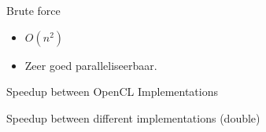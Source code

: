 \documentclass{beamer}
\begin{document}
	\begin{frame}{Brute force}
		\begin{itemize}
			\item $O(n^2)$
			\item Zeer goed paralleliseerbaar.
		\end{itemize}
		\codeBF
	\end{frame}
	\begin{frame}{Speedup between OpenCL Implementations}
		\begin{center}
			\resizebox{!}{.7\paperheight}{}
		\end{center}
	\end{frame}
	
	\begin{frame}{Speedup between different implementations (double)}
		\begin{center}
			\resizebox{!}{.7\paperheight}{}
		\end{center}
	\end{frame}
%
%	
%	

\end{document}
